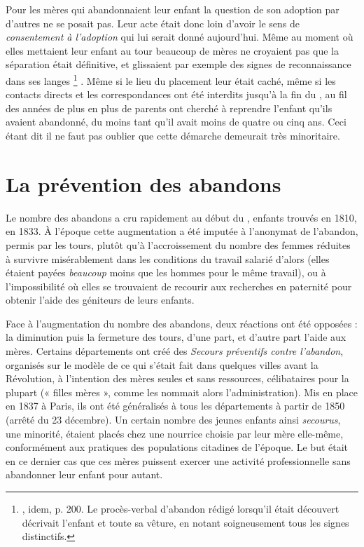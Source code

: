  Pour les mères qui abandonnaient leur enfant la question de son adoption par d'autres ne se posait pas. Leur acte était donc loin d'avoir le sens de \emph{consentement à l'adoption} qui lui serait donné aujourd'hui. Même au moment où elles mettaient leur enfant au tour beaucoup de mères ne croyaient pas que la séparation était définitive, et glissaient par exemple des signes de reconnaissance dans ses langes%
\footnote{, idem, p. 200. Le procès-verbal d'abandon rédigé lorsqu'il était découvert décrivait l'enfant et toute sa vêture, en notant soigneusement tous les signes distinctifs.}%
. Même si le lieu du placement leur était caché, même si les contacts directs et les correspondances ont été interdits jusqu'à la fin du , au fil des années de plus en plus de parents ont cherché à reprendre l'enfant qu'ils avaient abandonné, du moins tant qu'il avait moins de quatre ou cinq ans. Ceci étant dit il ne faut pas oublier que cette démarche demeurait très minoritaire.


\section{La prévention des abandons}

 Le nombre des abandons a cru rapidement au début du ,  enfants trouvés en 1810,  en 1833. À l'époque cette augmentation a été imputée à l'anonymat de l'abandon, permis par les tours, plutôt qu'à l'accroissement du nombre des femmes réduites à survivre misérablement dans les conditions du travail salarié d'alors (elles étaient payées \emph{beaucoup} moins que les hommes pour le même travail), ou à l'impossibilité où elles se trouvaient de recourir aux recherches en paternité pour obtenir l'aide des géniteurs de leurs enfants.

 Face à l'augmentation du nombre des abandons, deux réactions ont été opposées : la diminution puis la fermeture des tours, d'une part, et d'autre part l'aide aux mères. Certains départements ont créé des \emph{Secours préventifs contre l'abandon}, organisés sur le modèle de ce qui s'était fait dans quelques villes avant la Révolution, à l'intention des mères seules et sans ressources, célibataires pour la plupart (« filles mères », comme les nommait alors l'administration). Mis en place en 1837 à Paris, ils ont été généralisés à tous les départements à partir de 1850 (arrêté du 23 décembre). Un certain nombre des jeunes enfants ainsi \emph{secourus}, une minorité, étaient placés chez une nourrice choisie par leur mère elle-même, conformément aux pratiques des populations citadines de l'époque. Le but était en ce dernier cas que ces mères puissent exercer une activité professionnelle sans abandonner leur enfant pour autant.


